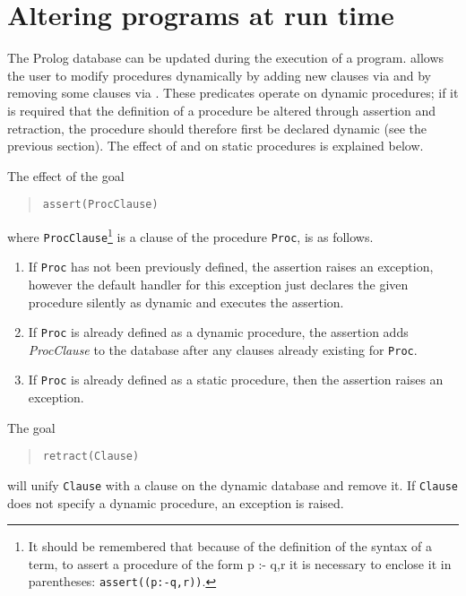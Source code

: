 \section{Altering programs at run time}

The Prolog database can be updated during the execution of a program.
{\eclipse} allows the user to modify procedures dynamically by adding
new clauses via  and by removing some clauses via .
These predicates operate on dynamic procedures; if it is
required that the definition of a procedure be altered through
assertion and retraction, the procedure should therefore first be declared
dynamic (see the previous section). The effect of  and
 on static procedures is explained below.


The effect of the goal
\begin{quote}
\begin{verbatim}
assert(ProcClause)
\end{verbatim}
\end{quote}
where
{\tt ProcClause}\footnote{It should be remembered that because of the
definition of the syntax of a term, to assert a procedure of the form p
:- q,r it is necessary to enclose it in parentheses:
{\tt assert((p:-q,r))}.}
is a clause of the procedure {\tt Proc}, is as follows.
\begin{enumerate}
\item If {\tt Proc} has not been previously defined, the assertion
raises an exception, however the default handler for this exception
just declares the given procedure silently as dynamic and executes
the assertion.

\item If {\tt Proc} is already defined as a dynamic procedure,
the assertion adds {\it ProcClause}
to the database after any clauses already existing for {\tt Proc}.

\item If {\tt Proc} is already defined as a static procedure, then the assertion
raises an exception.
\end{enumerate}

\noindent
The goal 
\begin{quote}
\begin{verbatim}
retract(Clause)
\end{verbatim} 
\end{quote}
will unify {\tt Clause} with a clause on the dynamic database and remove it.
If {\tt Clause} does not specify a dynamic procedure, an exception is raised.

